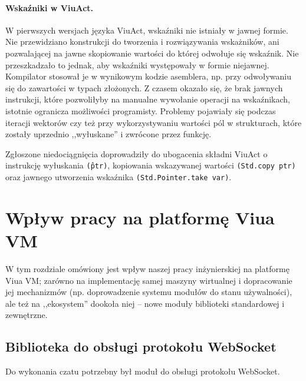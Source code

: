 \paragraph*{Wskaźniki w ViuAct.}
W pierwszych wersjach języka ViuAct, wskaźniki nie istniały w jawnej formie.
Nie przewidziano konstrukcji do tworzenia i rozwiązywania wskażników, ani
pozwalającej na jawne skopiowanie wartości do której odwołuje się wskaźnik.
Nie przeszkadzało to jednak, aby wskaźniki występowały w formie niejawnej.
Kompilator stosował je w wynikowym kodzie asemblera, np. przy odwoływaniu się do zawartości w typach złożonych. Z czasem okazało się, że brak jawnych instrukcji,
które pozwoliłyby na manualne wywołanie operacji na wskaźnikach, istotnie
ogranicza możliwości programisty. Problemy pojawiały się podczas iteracji
wektorów czy też przy wykorzystywaniu wartości pól w strukturach,
które zostały uprzednio ,,wyłuskane'' i zwrócone przez funkcję.

Zgłoszone niedociągnięcia doprowadziły do ubogacenia składni ViuAct o
instrukcję wyłuskania \texttt{(\^ ptr)}, kopiowania wskazywanej wartości
\texttt{(Std.copy ptr)} oraz jawnego utworzenia wskaźnika
 \texttt{(Std.Pointer.take var)}.

\section{Wpływ pracy na platformę Viua VM}

W tym rozdziale omówiony jest wpływ naszej pracy inżynierskiej na platformę Viua VM; zarówno na implementację
samej maszyny wirtualnej i dopracowanie jej mechanizmów (np. doprowadzenie systemu modułów do stanu
używalności), ale też na ,,ekosystem'' dookoła niej -- nowe moduły biblioteki standardowej i zewnętrzne.

\subsection{Biblioteka do obsługi protokołu WebSocket}

Do wykonania czatu potrzebny był moduł do obsługi protokołu WebSocket.
